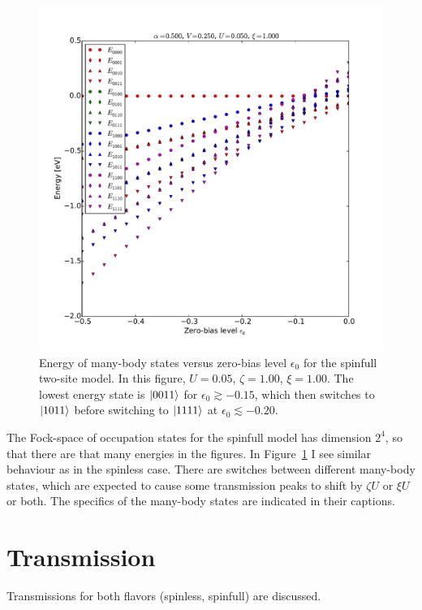 \begin{figure}[htb]
    \centering
    \includegraphics[height=.45\textheight]{pdf/energy/pespin_distribution_u1_k2.pdf}
    \caption{Energy of many-body states versus zero-bias level $\epsilon_0$ for the spinfull two-site model. In this figure, $U=0.05$, $\zeta=1.00$, $\xi=1.00$. The lowest energy state is $\ket{0011}$ for $\epsilon_0\gtrsim -0.15$, which then switches to $\ket{1011}$ before switching to $\ket{1111}$ at $\epsilon_0 \lesssim -0.20$.}
    \label{fig:perspinenergy12}
\end{figure}  


The Fock-space of occupation states for the spinfull model has dimension $2^4$, so that there are that many energies in the figures. In Figure~\ref{fig:perspinenergy12} I see similar behaviour as in the spinless case. There are switches between different many-body states, which are expected to cause some transmission peaks to shift by $\zeta U$ or $\xi U$ or both. The specifics of the many-body states are indicated in their captions.
\section{Transmission}
\label{sec:twositetransmission}
Transmissions for both flavors (spinless, spinfull) are discussed. 
